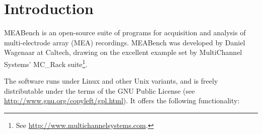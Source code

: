 \documentclass[12pt,oneside]{book}
\def\Meabench{{MEABench}\xspace}
\begin{document}
\pagebreak

\tableofcontents

\pagebreak

\chapter{Introduction}

\Meabench is an open-source suite of programs for acquisition and
analysis of multi-electrode array (MEA) recordings. \Meabench was
developed by Daniel Wagenaar at Caltech, drawing on the excellent
example set by MultiChannel Systems' MC\_Rack 
suite\footnote{See \url{http://www.multichannelsystems.com}.}.

The software runs under Linux and other Unix variants, and is freely
distributable under the terms of the GNU Public License (see
\url{http://www.gnu.org/copyleft/gpl.html}). It offers the following
functionality:
\end{document}
